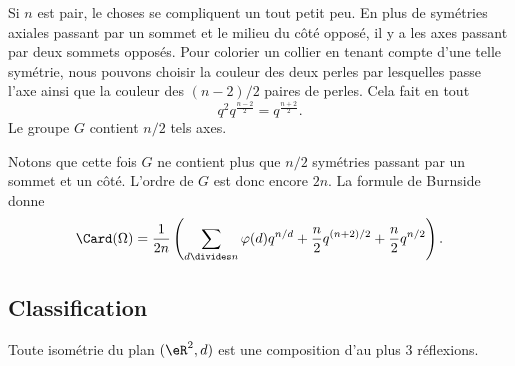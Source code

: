 Si \( n\) est pair, le choses se compliquent un tout petit peu. En plus de symétries axiales passant par un sommet et le milieu du côté opposé, il y a les axes passant par deux sommets opposés. Pour colorier un collier en tenant compte d'une telle symétrie, nous pouvons choisir la couleur des deux perles par lesquelles passe l'axe ainsi que la couleur des \( (n-2)/2\) paires de perles. Cela fait en tout
\begin{equation}
	q^2q^{\frac{ n-2 }{2}}=q^{\frac{ n+2 }{2}}.
\end{equation}
Le groupe \( G\) contient \( n/2\) tels axes.

Notons que cette fois \( G\) ne contient plus que \( n/2\) symétries passant par un sommet et un côté. L'ordre de \( G\) est donc encore \( 2n\). La formule de Burnside donne
\begin{equation}
	\Card(\Omega)=\frac{1}{ 2n }\left( \sum_{d\divides n}\varphi(d)q^{n/d}+\frac{ n }{2}q^{(n+2)/2}+\frac{ n }{2}q^{n/2} \right).
\end{equation}

\subsection{Classification}

\begin{theorem}      \label{THOooRORQooTDWFdv}
	Toute isométrie du plan \( (\eR^2,d)\) est une composition d'au plus \( 3\) réflexions.
\end{theorem}

